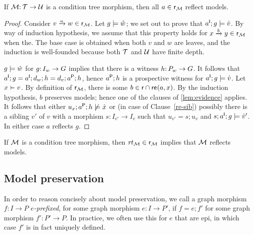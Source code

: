 \begin{lemma}\label{lem:reflection}
If $\cM\of \cT\to \cU$ is a condition tree morphism, then all $a\in\rgen_\cM$ reflect models.
\end{lemma}
%
\begin{proof}
Consider $\trip vaw\in \rgen_\cM$. Let $g\sat \hat w$; we set out to prove that $a\I;g\sat \hat v$. By way of induction hypothesis, we assume that this property holds for $\trip xby\in \rgen_\cM$ when the. The base case is obtained when both $v$ and $w$ are leaves, and the induction is well-founded because both $\cT$ and $\cU$ have finite depth.

$g\sat \hat w$ for $g\of I_w\to G$ implies that there is a witness $h\of P_w\to G$. It follows that $a\I;g=a\I;d_w;h=d_v;a\P;h$, hence $a\P;h$ is a prospective witness for $a\I;g\sat \hat v$. Let $x\childof v$. By definition of $\rgen_\cM$, there is some $b\in \rgen \cap \re{a,x}$. By the induction hypothesis, $b$ preserves models; hence one of the clauses of \cref{lem:evidence} applies. It follows that either $u_x;a\P;h\nsat \hat x$ or (in case of Clause~\ref{re-sib}) possibly there is a sibling $v'$ of $v$ with a morphism $s:I_{v'}\to I_v$ such that $u_{v'}=s;u_v$ and $s;a\I;g\sat \hat v'$. In either case $a$ reflects $g$.
\end{proof}

\begin{corollary}
If $\cM$ is a condition tree morphism, then $\rt\cM\in \rgen_\cM$ implies that $\cM$ reflects models.
\end{corollary}

\subsection{Model preservation}

In order to reason concisely about model preservation, we call a graph morphism $f:I\to P$ \emph{$e$-prefixed}, for some graph morphism $e:I\to P'$, if $f=e;f'$ for some graph morphism $f':P'\to P$. In practice, we often use this for $e$ that are epi, in which case $f'$ is in fact uniquely defined.

